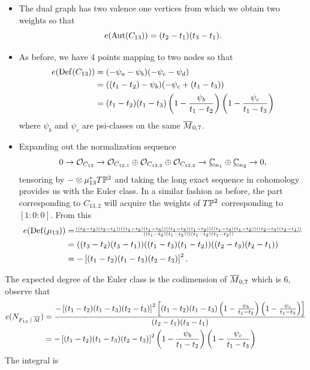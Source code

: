 \documentclass[12pt]{memoir}
\begin{document}
\begin{Ex}
\begin{figure}[h!]
    \end{figure}
    \begin{itemize}
        \item The dual graph has two valence one vertices from which we obtain two weights so that 
        $$e(\operatorname{Aut}(C_{13}))=(t_2-t_1)(t_3-t_1).$$
        \item As before, we have 4 points mapping to two nodes so that  \begin{align*}
            e(\operatorname{Def}(C_{13}))&=(-\psi_a-\psi_b)(-\psi_c-\psi_d)\\
            &=((t_1-t_2)-\psi_b)(-\psi_c+(t_1-t_3))\\
            &=(t_1-t_2)(t_1-t_3)\left(1-\frac{\psi_b}{t_1-t_2}\right)\left(1-\frac{\psi_c}{t_1-t_3}\right)
        \end{align*}
        where $\psi_b$ and $\psi_c$ are psi-classes on the same $\overline M_{0,7}$. 
        \item Expanding out the normalization sequence  
        $$0\to\mathcal{O}_{C_{13}}\to\mathcal{O}_{C_{13,1}}\oplus\mathcal{O}_{C_{13,2}}\oplus\mathcal{O}_{C_{13,3}}\to\underline{\mathbb{C}}_{n_1}\oplus\underline{\mathbb{C}}_{n_2}\to 0,$$
        tensoring by $-\otimes\mu_{13}^\ast T\mathbb{P}^2$ and taking the long exact sequence in cohomology provides us with the Euler class. In a similar fashion as before, the part corresponding to $C_{13,2}$ will acquire the weights of $T\mathbb{P}^2$ corresponding to $[1:0:0]$. From this
        \begin{align*}
             e(\operatorname{Def}(\mu_{13}))&=\scriptstyle\frac{((t_3-t_2)(t_3-t_1))((t_1-t_2)(t_1-t_3))((t_1-t_3)(t_1-t_2))((t_1-t_3)(t_1-t_2))((t_2-t_3)(t_2-t_1))}{((t_1-t_3)(t_1-t_2))((t_1-t_3)(t_1-t_2))}\\
             &=((t_3-t_2)(t_3-t_1))((t_1-t_3)(t_1-t_2))((t_2-t_3)(t_2-t_1))\\
             &=-\left\lbrack(t_1-t_2)(t_1-t_3)(t_2-t_3)\right\rbrack^2.
        \end{align*}
    \end{itemize}
    The expected degree of the Euler class is the codimension of $\overline M_{0,7}$ which is $6$, observe that 
        \begin{align*}
        e(N_{F_{13}\mid\ov M})&=\frac{-\bonj{(t_1-t_2)(t_1-t_3)(t_2-t_3)}^2\bonj{(t_1-t_2)(t_1-t_3)\left(1-\frac{\psi_b}{t_1-t_2}\right)\left(1-\frac{\psi_c}{t_1-t_3}\right)}}{(t_2-t_1)(t_3-t_1)}\\
        &=-\bonj{(t_1-t_2)(t_1-t_3)(t_2-t_3)}^2\left(1-\frac{\psi_b}{t_1-t_2}\right)\left(1-\frac{\psi_c}{t_1-t_3}\right)
    \end{align*}
    The integral is 

\end{Ex}
\end{document}
